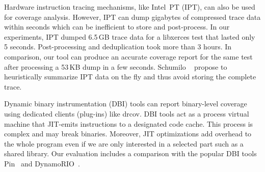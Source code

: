 Hardware instruction tracing mechanisms, like Intel\textsuperscript{\textregistered}~PT (IPT), can also be used for coverage analysis.
However, IPT can dump gigabytes of compressed trace data within seconds which can be inefficient to store and post-process.
In our experiments, IPT dumped 6.5\,GB trace data for a \textsf{libxerces} test that lasted only 5 seconds. 
Post-processing and deduplication took more than 3 hours.
In comparison, our tool can produce an accurate coverage report for the same test after processing a 53\,KB dump in a few seconds.
Schumilo {\etal}~\cite{kAFL:Schumilo2017} propose to heuristically summarize IPT data on the fly and thus avoid storing the complete trace.

Dynamic binary instrumentation (DBI) tools can report binary-level coverage using dedicated clients (plug-ins) like \textsf{drcov}.
DBI tools act as a process virtual machine that JIT-emits instructions to a designated code cache.
This process is complex and may break binaries. 
Moreover, JIT optimizations add overhead to the whole program even if we are only interested in a selected part such as a shared library.
Our evaluation includes a comparison with the popular DBI tools  \textsf{Pin}~\cite{IntelPinWeb} and \textsf{DynamoRIO}~\cite{DynamoRIOWeb}.


